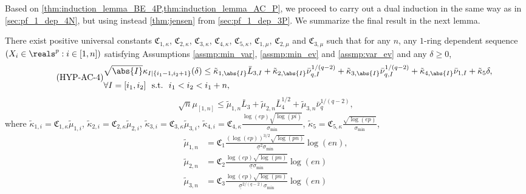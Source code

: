 \documentclass[aos]{imsart}
\begin{document}
\begin{appendix}
\medskip
{} Based on \cref{thm:induction_lemma_BE_4P,thm:induction_lemma_AC_P}, we proceed to carry out a dual induction in the same way as in \cref{sec:pf_1_dep_4N}, but using instead \cref{thm:jensen} from \cref{sec:pf_1_dep_3P}. We summarize the final result in the next lemma.
\begin{lemma}
    There exist positive universal constants $\mathfrak{C}_{1,\kappa}$, $\mathfrak{C}_{2,\kappa}$, $\mathfrak{C}_{3,\kappa}$, $\mathfrak{C}_{4,\kappa}$, $\mathfrak{C}_{5,\kappa}$, $\mathfrak{C}_{1,\mu}$, $\mathfrak{C}_{2,\mu}$ and $\mathfrak{C}_{3,\mu}$ such that for any $n$, any $1$-ring dependent sequence $(X_i \in \reals^p: i \in [1,n])$ satisfying Assumptions \eqref{assmp:min_var}, \eqref{assmp:min_ev} and \eqref{assmp:var_ev} and any $\delta \geq 0$,
    \begin{equation} \label{eq:hypothesis_AC_4P} \tag{HYP-AC-4}
    \begin{aligned}
        & \sqrt{\abs{I}} \kappa_{I|\{i_1-1, i_2+1\}}(\delta)
        \leq 
        \tilde\kappa_{1,\abs{I}} \bar{L}_{3,I}
        + \tilde\kappa_{2,\abs{I}} \bar\nu_{q,I}^{1/(q-2)}
        + \tilde\kappa_{3,\abs{I}} \bar\nu_{q,I}^{1/(q-2)}
        + \tilde\kappa_{4,\abs{I}} \bar\nu_{1,I}
        + \tilde\kappa_{5} \delta, \\
        & \forall I = [i_1, i_2] ~~\text{s.t.}~~ i_1 < i_2 < i_1+n,
    \end{aligned}
    \end{equation}
    \begin{equation} \label{eq:hypothesis_BE_4P} \tag{HYP-BE-4}
        \sqrt{n} \mu_{[1,n]}
        \leq \tilde\mu_{1,n} \bar{L}_{3}
        + \tilde\mu_{2,n} \bar{L}_{4}^{1/2}
        + \tilde\mu_{3,n} \bar\nu_{q}^{1/(q-2)},
    \end{equation}
    where $\tilde\kappa_{1,i} = \mathfrak{C}_{1,\kappa} \tilde\mu_{1,i}$, 
    $\tilde\kappa_{2,i} = \mathfrak{C}_{2,\kappa} \tilde\mu_{2,i}$, 
    $\tilde\kappa_{3,i} = \mathfrak{C}_{3,\kappa} \tilde\mu_{3,i}$,
    $\tilde\kappa_{4,i} = \mathfrak{C}_{4,\kappa} \frac{\log(ep)\sqrt{\log(pi)}}{\sigma_{\min}}$,
    $\tilde\kappa_{5} = \mathfrak{C}_{5,\kappa} \frac{\sqrt{\log(ep)}}{\sigma_{\min}}$,
    \begin{equation*}
    \begin{aligned}
        \tilde\mu_{1,n} 
        & = \mathfrak{C}_1 \frac{(\log(ep))^{3/2}\sqrt{\log(pn)}}{\underline\sigma^2\sigma_{\min}} \log\left(e n\right), \\
        \tilde\mu_{2,n}
        & = \mathfrak{C}_2 \frac{\log(ep)\sqrt{\log(pn)}}{\underline\sigma \sigma_{\min}} \log\left(e n\right) \\
        \tilde\mu_{3,n}
        & = \mathfrak{C}_3 \frac{\log(ep)\sqrt{\log(pn)}}{\underline\sigma^{2/(q-2)} \sigma_{\min}} \log\left(e n\right)
    \end{aligned}
    \end{equation*}
\end{lemma}


\end{appendix}
\end{document}
